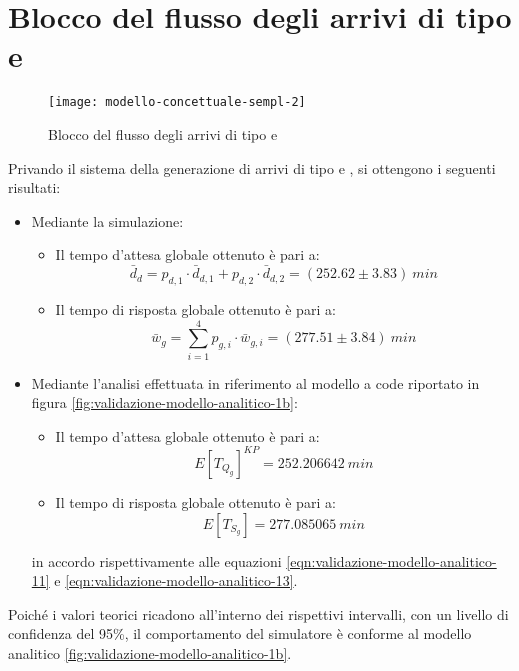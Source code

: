 \section{Blocco del flusso degli arrivi di tipo \uo{} e \pp{}}
\begin{figure}[ht]
\centering
\texttt{[image: modello-concettuale-sempl-2]}
\caption{Blocco del flusso degli arrivi di tipo \uo{} e \pp{}}
\label{fig:modello-concettuale-semp-2}
\end{figure}
Privando il sistema della generazione di arrivi di tipo \uo{} e \pp{}, si ottengono i seguenti risultati:
\begin{itemize}
\item Mediante la simulazione:
\begin{itemize}
\item Il tempo d'attesa globale ottenuto è pari a:
\begin{equation} 
\bar{d}_d = p_{d,1}\cdot \bar{d}_{d,1} + p_{d,2}\cdot \bar{d}_{d,2} = (252.62 \pm 3.83)\ min
\end{equation}
\item Il tempo di risposta globale ottenuto è pari a:
\begin{equation}
\bar{w}_g = \sum_{i = 1}^4 p_{g,i}\cdot \bar{w}_{g,i} = (277.51 \pm 3.84)\ min
\end{equation}
\end{itemize}

\item Mediante l'analisi effettuata in riferimento al modello a code riportato in figura \ref{fig:validazione-modello-analitico-1b}:
\begin{itemize}
\item Il tempo d'attesa globale ottenuto è pari a:
\begin{equation}
E[T_{Q_g}]^{KP} = 252.206642\ min 
\end{equation}
\item Il tempo di risposta globale ottenuto è pari a:
\begin{equation}
E[T_{S_g}] = 277.085065\ min 
\end{equation}
\end{itemize}
in accordo rispettivamente alle equazioni \ref{eqn:validazione-modello-analitico-11} e \ref{eqn:validazione-modello-analitico-13}.
\end{itemize}

Poiché i valori teorici ricadono all'interno dei rispettivi intervalli, con un livello di confidenza del 95\%, il comportamento del simulatore è conforme al modello analitico \ref{fig:validazione-modello-analitico-1b}.


